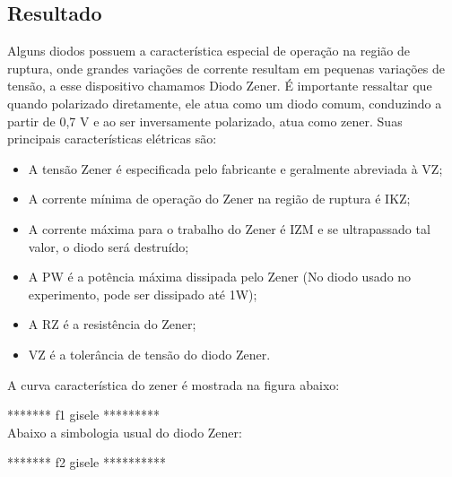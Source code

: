 \subsection{Resultado}
Alguns diodos possuem a característica especial de operação na região de ruptura, onde grandes variações de corrente resultam em pequenas variações de tensão, a esse dispositivo chamamos Diodo Zener. 
É importante ressaltar que quando polarizado diretamente, ele atua como um diodo comum, conduzindo a partir de 0,7 V e ao ser inversamente polarizado, atua como zener.
Suas principais características elétricas são:
\begin{itemize}
	\item A tensão Zener é especificada pelo fabricante e geralmente abreviada à VZ;
	\item A corrente mínima de operação do Zener na região de ruptura é IKZ;
	\item A corrente máxima para o trabalho do Zener é IZM e se ultrapassado tal valor, o diodo será destruído;
	\item A PW é a potência máxima dissipada pelo Zener (No diodo usado no experimento, pode ser dissipado até 1W);
	\item A RZ é a resistência do Zener;
	\item VZ é a tolerância de tensão do diodo Zener.
\end{itemize}

A curva característica do zener é mostrada na figura abaixo:

******* f1 gisele ********* \\

Abaixo a simbologia usual do diodo Zener:

******* f2 gisele **********